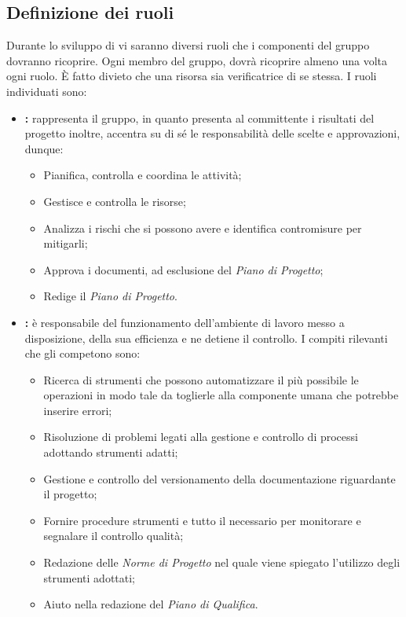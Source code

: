 \subsection{Definizione dei ruoli}
\label{defRuoli}
Durante lo sviluppo di \project{} vi saranno diversi ruoli che i componenti del gruppo dovranno ricoprire. Ogni membro del gruppo, dovrà ricoprire almeno una volta ogni ruolo. È fatto divieto che una risorsa sia verificatrice di se stessa.
I ruoli individuati sono:
\begin{itemize}
\item \textbf{\projectManager:} rappresenta il gruppo, in quanto presenta al committente i risultati del progetto inoltre, accentra su di sé le responsabilità delle scelte e approvazioni, dunque:
	\begin{itemize}
	\item Pianifica, controlla e coordina le attività;
	\item Gestisce e controlla le risorse;
	\item Analizza i rischi che si possono avere e identifica contromisure per mitigarli;
	\item Approva i documenti, ad esclusione del \emph{Piano di Progetto};	
	\item Redige il \emph{Piano di Progetto}.	
	\end{itemize}
\item \textbf{\administrator:} è responsabile del funzionamento dell'ambiente di lavoro messo a disposizione, della sua efficienza e ne detiene il controllo.
I compiti rilevanti che gli competono sono:
	\begin{itemize}
	\item Ricerca di strumenti che possono automatizzare il più possibile le operazioni in modo tale da toglierle alla componente umana che potrebbe inserire errori;
	\item Risoluzione di problemi legati alla gestione e controllo di processi adottando strumenti adatti;
	\item Gestione e controllo del versionamento della documentazione riguardante il progetto;
	\item Fornire procedure strumenti e tutto il necessario per monitorare e segnalare il controllo qualità;
	\item Redazione delle \emph{Norme di Progetto} nel quale viene spiegato l'utilizzo degli strumenti adottati;
	\item Aiuto nella redazione del \emph{Piano di Qualifica}.
	\end{itemize}			

\end{itemize}
